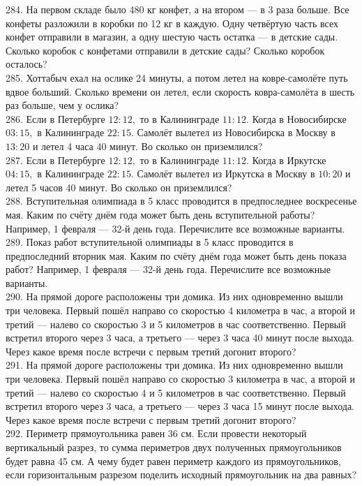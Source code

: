 284. На первом складе было 480 кг конфет, а на втором --- в 3 раза больше. Все конфеты разложили в коробки по 12 кг в каждую. Одну четвёртую часть всех конфет отправили в магазин, а одну шестую часть остатка --- в детские сады. Сколько коробок с конфетами отправили в детские сады? Сколько коробок осталось?\\
285. Хоттабыч ехал на ослике 24 минуты, а потом летел на ковре-самолёте путь вдвое больший. Сколько времени он летел, если скорость ковра-самолёта в шесть раз больше, чем у ослика?\\
286. Если в Петербурге $12:12,$ то в Калининграде $11:12.$ Когда в Новосибирске $03:15,$ в Калининграде $22:15.$ Самолёт вылетел из Новосибирска в Москву в $13:20$ и летел 4 часа 40 минут. Во сколько он приземлился?\\
287. Если в Петербурге $12:12,$ то в Калининграде $11:12.$ Когда в Иркутске $04:15,$ в Калининграде $22:15.$ Самолёт вылетел из Иркутска в Москву в $10:20$ и летел 5 часов 40 минут. Во сколько он приземлился?\\
288. Вступительная олимпиада в 5 класс проводится в предпоследнее воскресенье мая. Каким по счёту днём года может быть день вступительной работы? Например, 1 февраля --- 32-й день года. Перечислите все возможные варианты.\\
289. Показ работ вступительной олимпиады в 5 класс проводится в предпоследний вторник мая. Каким по счёту днём года может быть день показа работ? Например, 1 февраля --- 32-й день года. Перечислите все возможные варианты.\\
290. На прямой дороге расположены три домика. Из них одновременно вышли три человека. Первый пошёл направо со скоростью 4 километра в час, а второй и третий --- налево со скоростью 3 и 5 километров в час соответственно. Первый встретил второго через 3 часа, а третьего --- через 3 часа 40 минут после выхода. Через какое время после встречи с первым третий догонит второго?\\
291. На прямой дороге расположены три домика. Из них одновременно вышли три человека. Первый пошёл направо со скоростью 3 километра в час, а второй и третий --- налево со скоростью 4 и 5 километров в час соответственно. Первый встретил второго через 3 часа, а третьего --- через 3 часа 15 минут после выхода. Через какое время после встречи с первым третий догонит второго?\\
292. Периметр прямоугольника равен 36 см. Если провести некоторый вертикальный разрез, то сумма периметров двух полученных прямоугольников будет равна 45 см. А чему будет равен периметр каждого из прямоугольников, если горизонтальным разрезом поделить исходный прямоугольник на два равных?\\
